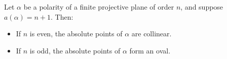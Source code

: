 Let $\alpha$ be a polarity of a finite projective plane of order $n$, and suppose $a(\alpha) = n+1$. Then:
\begin{itemize}
\item If $n$ is even, the absolute points of $\alpha$ are collinear.
\item If $n$ is odd, the absolute points of $\alpha$ form an oval.
\end{itemize}
